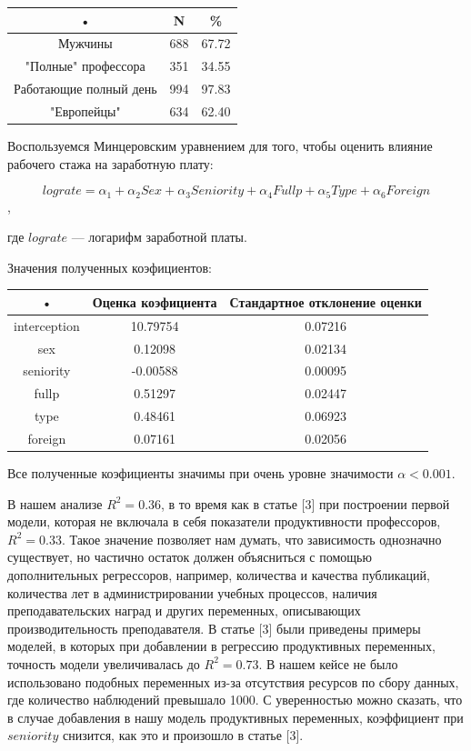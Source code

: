 \documentclass[a4paper, 12pt]{article}
\theoremstyle{definition}
\theoremstyle{plain}
\begin{document}
\begin{center}
\begin{tabular}{|c|c|c|}
\hline 
• & N & \% \\ 
\hline 
Мужчины & 688 & 67.72 \\ 
\hline 
"Полные" профессора & 351 & 34.55 \\ 
\hline 
Работающие полный день & 994 & 97.83 \\ 
\hline 
"Европейцы" & 634 & 62.40 \\ 
\hline 
\end{tabular} 
\end{center}

Воспользуемся Минцеровским уравнением для того, чтобы оценить влияние рабочего стажа на заработную плату:

$$lograte=\alpha_1+\alpha_2 Sex+\alpha_3 Seniority +\alpha_4 Fullp+\alpha_5 Type +\alpha_6 Foreign$$, 

где $lograte$ --- логарифм заработной платы.

Значения полученных коэфициентов:

\begin{center}
\begin{tabular}{|c|c|c|}
\hline 
• & Оценка коэфициента & Стандартное отклонение оценки \\ 
\hline 
interception & 10.79754 & 0.07216 \\ 
\hline 
sex & 0.12098 & 0.02134 \\ 
\hline 
seniority & -0.00588 & 0.00095 \\ 
\hline 
fullp & 0.51297 & 0.02447 \\ 
\hline 
type & 0.48461 & 0.06923 \\ 
\hline 
foreign & 0.07161 & 0.02056 \\ 
\hline 
\end{tabular} 
\end{center}

Все полученные коэфициенты значимы  при очень уровне значимости $\alpha<0.001$.

В нашем анализе $R^2=0.36$, в то время как в статье [3] при построении первой модели, которая не включала в себя показатели продуктивности профессоров, $R^2=0.33$. Такое значение позволяет нам думать, что зависимость однозначно существует, но частично остаток должен объясниться с помощью дополнительных регрессоров, например, количества и качества публикаций, количества лет в администрировании учебных процессов, наличия преподавательских наград и других переменных, описывающих производительность преподавателя. В статье [3] были приведены примеры моделей, в которых при добавлении в регрессию продуктивных переменных, точность модели увеличивалась до $R^2=0.73$. В нашем кейсе не было использовано подобных переменных из-за отсутствия ресурсов по сбору данных, где количество наблюдений превышало 1000. С уверенностью можно сказать, что в случае добавления в нашу модель продуктивных переменных, коэффициент при $seniority$ снизится, как это и произошло в статье [3]. 
\end{document}
